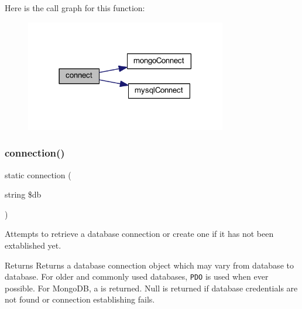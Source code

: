 Here is the call graph for this function\+:\nopagebreak
\begin{figure}[H]
\begin{center}
\leavevmode
\includegraphics[width=249pt]{class_d_b_connection_a1191ef26fe6381a3bfbd33c0c6f7b9f4_cgraph}
\end{center}
\end{figure}
\mbox{\label{class_d_b_connection_aeb96471cf6f9d9205d22e8b17c2277c3}} 
\subsubsection{connection()}
{\footnotesize\ttfamily static connection (\begin{DoxyParamCaption}\item[{string}]{\$db }\end{DoxyParamCaption})\hspace{0.3cm}{\ttfamily [static]}}

Attempts to retrieve a database connection or create one if it has not been extablished yet. \begin{DoxyReturn}{Returns}
Returns a database connection object which may vary from database to database. For older and commonly used databases, {\tt P\+DO} is used when ever possible. For Mongo\+DB, a {\tt } is returned. Null is returned if database credentials are not found or connection establishing fails. 
\end{DoxyReturn}

